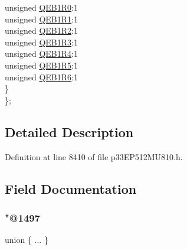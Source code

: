 \begin{DoxyCompactItemize}
\begin{tabbing}
\>\>unsigned \hyperlink{structtag_r_p_i_n_r14_b_i_t_s_ab727e29eaebffa3c4a7a72e5dcb3fa84}{QEB1R0}:1\\
\>\>unsigned \hyperlink{structtag_r_p_i_n_r14_b_i_t_s_a73ff9c4b0ee37d699024389082b8b77f}{QEB1R1}:1\\
\>\>unsigned \hyperlink{structtag_r_p_i_n_r14_b_i_t_s_a27dc0cffbd31935d1b9e0b3d12c7f408}{QEB1R2}:1\\
\>\>unsigned \hyperlink{structtag_r_p_i_n_r14_b_i_t_s_afc229798cfbcd1581723d0af28245b69}{QEB1R3}:1\\
\>\>unsigned \hyperlink{structtag_r_p_i_n_r14_b_i_t_s_a9288de327009fa009b4b9d5d267502f8}{QEB1R4}:1\\
\>\>unsigned \hyperlink{structtag_r_p_i_n_r14_b_i_t_s_a892b4d2e8c941bc10521af979081d92f}{QEB1R5}:1\\
\>\>unsigned \hyperlink{structtag_r_p_i_n_r14_b_i_t_s_a162c842cf3883ad348af16ee480d764b}{QEB1R6}:1\\
\>\} \\
\}; \\

\end{tabbing}\end{DoxyCompactItemize}


\subsection{Detailed Description}


Definition at line 8410 of file p33\+E\+P512\+M\+U810.\+h.



\subsection{Field Documentation}
\mbox{\label{structtag_r_p_i_n_r14_b_i_t_s_a195cc625740fca1952b80172ce37940d}} 
\subsubsection{\texorpdfstring{"@1497}{@1497}}
{\footnotesize\ttfamily union \{ ... \} }

\mbox{\label{structtag_r_p_i_n_r14_b_i_t_s_adf71f3d8410c1f1dbbc96680a92c49af}} 
